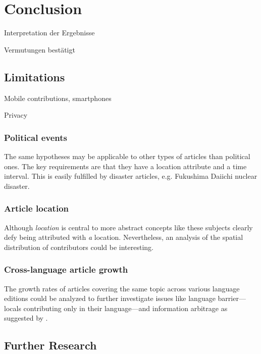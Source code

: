 \chapter{Conclusion}\label{ch:conclusion}

\begin{todos}
    \item Interpretation der Ergebnisse
    \item Vermutungen bestätigt
\end{todos}



\section{Limitations}

\begin{todos}
    \item Mobile contributions, smartphones
    \item Privacy
\end{todos}

\subsection{Political events}
The same hypotheses may be applicable to other types of articles than political ones.
The key requirements are that they have a location attribute and a time interval.
This is easily fulfilled by disaster articles, e.g. Fukushima Daiichi nuclear disaster.

\subsection{Article location}
Although \emph{location} is central to more abstract concepts like  these subjects clearly defy being attributed with \emph{a} location.
Nevertheless, an analysis of the spatial distribution of contributors could be interesting. 

\subsection{Cross-language article growth}
The growth rates of articles covering the same topic across various language editions could be analyzed to further investigate issues like language barrier---locals contributing only in their language---and information arbitrage as suggested by \textcite{adar2009information}.

\section{Further Research}
